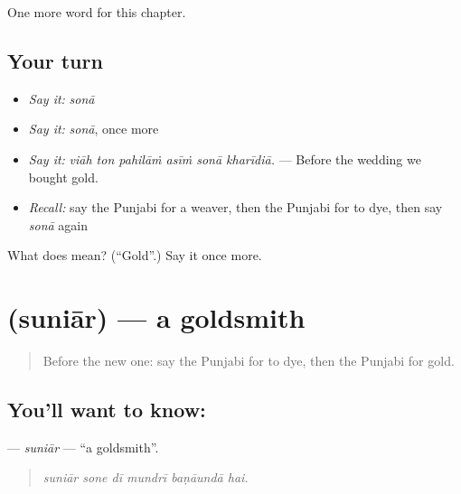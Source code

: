 \begin{grammarlens}[title={What you've built}]
One more word for this chapter.
\end{grammarlens}

\subsection*{Your turn}
\begin{itemize}
\raggedright
  \item \emph{Say it:} \emph{sonā}
  \item \emph{Say it:} \emph{sonā}, once more
  \item \emph{Say it:} \emph{viāh ton pahilāṁ asīṁ sonā kharīdiā.} — Before the wedding we bought gold.
  \item \emph{Recall:} say the Punjabi for a weaver, then the Punjabi for to dye, then say \emph{sonā} again
\end{itemize}

\begin{tcolorbox}[breakable,colback=teal!4,colframe=teal!35!black,title={Before you move on}]
What does  mean? (\textquotedblleft{}Gold\textquotedblright{}.) Say it once more.
\end{tcolorbox}
\section[\texorpdfstring{\pa{ਸੁਨਿਆਰ} (suniār)}{ਸੁਨਿਆਰ (suniār)}]{ (suniār) — a goldsmith}

\label{lesson:PA-C335-suniar}



\begin{quote}
Before the new one: say the Punjabi for to dye, then the Punjabi for gold.
\end{quote}

\subsection*{You'll want to know: }
\textbf{} — \emph{suniār} — \textquotedblleft{}a goldsmith\textquotedblright{}.

\begin{quote}
     
\end{quote}

\begin{quote}
\emph{suniār sone dī mundrī baṇāundā hai.}
\end{quote}

